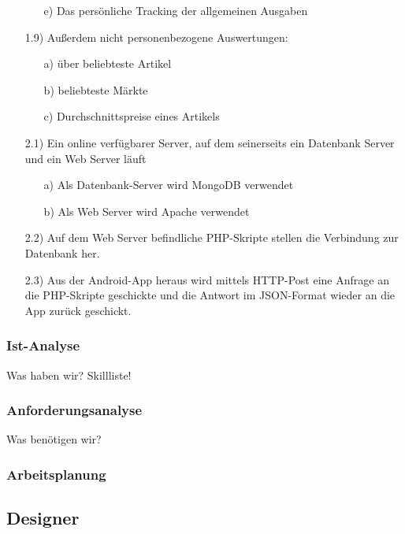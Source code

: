 \documentclass[12pt,a4paper]{article}
\begin{document}
\begin{itemize}
\begin{itemize}
\item[e)]Das persönliche Tracking der allgemeinen Ausgaben
\end{itemize}
 \item[1.9)] Außerdem nicht personenbezogene Auswertungen:
 \begin{itemize}
\item[a)]über beliebteste Artikel
\item[b)] beliebteste Märkte
\item[c)] Durchschnittspreise eines Artikels
\end{itemize}
 \item[2.1)] Ein online verfügbarer Server, auf dem seinerseits ein Datenbank Server und ein Web Server läuft
 \begin{itemize}
\item[a)]Als Datenbank-Server wird MongoDB verwendet
\item[b)]Als Web Server wird Apache verwendet
\end{itemize}
\item[2.2)] Auf dem Web Server befindliche PHP-Skripte stellen die Verbindung zur Datenbank her.
\item[2.3)] Aus der Android-App heraus wird mittels HTTP-Post eine Anfrage an die PHP-Skripte geschickte und die Antwort im JSON-Format wieder an die App zurück geschickt.
\end{itemize}
\newpage

\subsubsection{Ist-Analyse}
Was haben wir? Skillliste!
\newpage

\subsubsection{Anforderungsanalyse}
Was benötigen wir? 
\newpage

\subsubsection{Arbeitsplanung}
\subsection{Designer}
\end{document}
